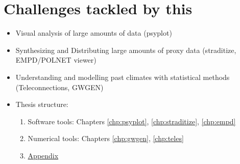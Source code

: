 
\section{Challenges tackled by this} \label{sec:intro-thesis-overview}

\begin{itemize}
	\item Visual analysis of large amounts of data (psyplot)
	\item Synthesizing and Distributing large amounts of proxy data (straditize, EMPD/POLNET viewer)
	\item Understanding and modelling past climates with statistical methods (Teleconnections, GWGEN)
	\item Thesis structure:
		\begin{enumerate}
			\item Software tools: Chapters \ref{chp:psyplot}, \ref{chp:straditize}, \ref{chp:empd}
			\item Numerical tools: Chapters \ref{chp:gwgen}, \ref{chp:teles}
			\item \hyperlink{appendix}{Appendix}
		\end{enumerate}
\end{itemize}
